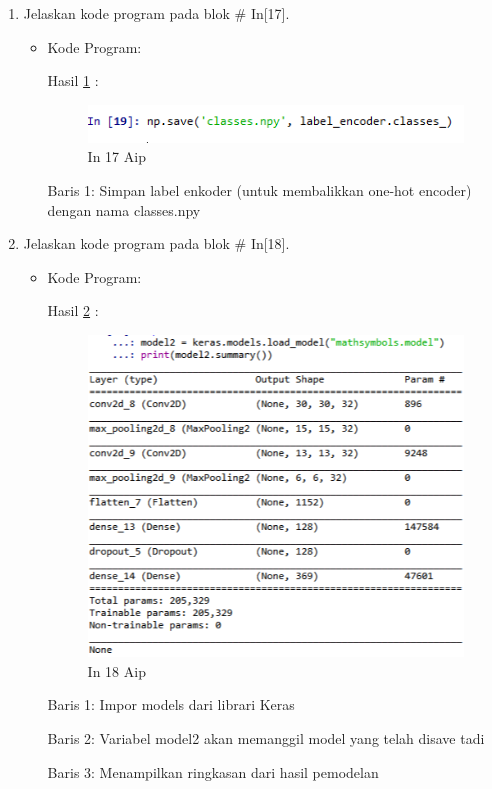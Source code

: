 \begin{enumerate}
\item Jelaskan kode program pada blok \# In[17].
\begin{itemize}
\item Kode Program:

\par Hasil \ref{in17aip} :
\begin{figure}[!hbtp]
\centering
\includegraphics[scale=0.7]{figures/AIP/prak17.PNG}
\caption{In 17 Aip}
\label{in17aip}
\end{figure}
\par Baris 1: Simpan label enkoder (untuk membalikkan one-hot encoder) dengan nama classes.npy
\end{itemize}
\par

\item Jelaskan kode program pada blok \# In[18].
\begin{itemize}
\item Kode Program:

\par Hasil \ref{in18aip} :
\begin{figure}[!hbtp]
\centering
\includegraphics[scale=0.7]{figures/AIP/prak18.PNG}
\caption{In 18 Aip}
\label{in18aip}
\end{figure}
\par Baris 1: Impor models dari librari Keras
\par Baris 2: Variabel model2 akan memanggil model yang telah disave tadi 
\par Baris 3:  Menampilkan ringkasan dari hasil pemodelan
\end{itemize}
\par



\end{enumerate}
